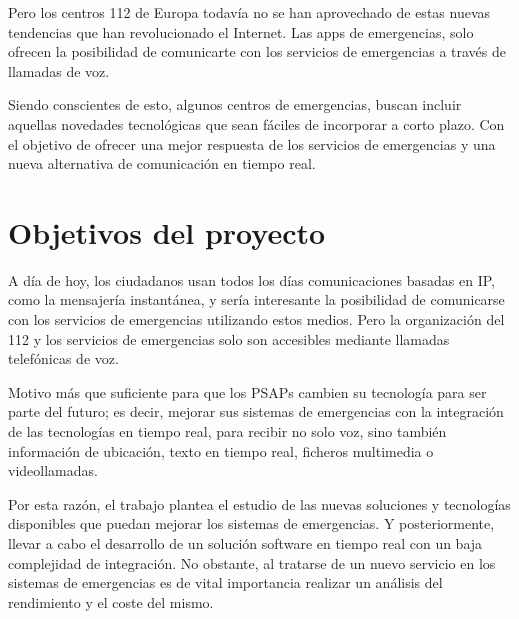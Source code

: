 Pero los centros 112 de Europa todavía no se han aprovechado de estas nuevas tendencias que han revolucionado el Internet. Las apps de emergencias, solo ofrecen la posibilidad de comunicarte con los servicios de emergencias a través de llamadas de voz.

Siendo conscientes de esto, algunos centros de emergencias, buscan incluir aquellas novedades tecnológicas que sean fáciles de incorporar a corto plazo. Con el objetivo de ofrecer una mejor respuesta de los servicios de emergencias y una nueva alternativa de comunicación en tiempo real.

\section{Objetivos del proyecto}

A día de hoy, los ciudadanos usan todos los días comunicaciones basadas en IP, como la mensajería instantánea, y sería interesante la posibilidad de comunicarse con los servicios de emergencias utilizando estos medios. Pero la organización del 112 y los servicios de emergencias solo son accesibles mediante llamadas telefónicas de voz.

Motivo más que suficiente para que los PSAPs cambien su tecnología para ser parte del futuro; es decir, mejorar sus sistemas de emergencias con la integración de las tecnologías en tiempo real, para recibir no solo voz, sino también información de ubicación, texto en tiempo real, ficheros multimedia o videollamadas.

Por esta razón, el trabajo plantea el estudio de las nuevas soluciones y tecnologías disponibles que puedan mejorar los sistemas de emergencias. Y posteriormente, llevar a cabo el desarrollo de un solución software en tiempo real con un baja complejidad de integración. No obstante, al tratarse de un nuevo servicio en los sistemas de emergencias es de vital importancia realizar un análisis del rendimiento y el coste del mismo.
